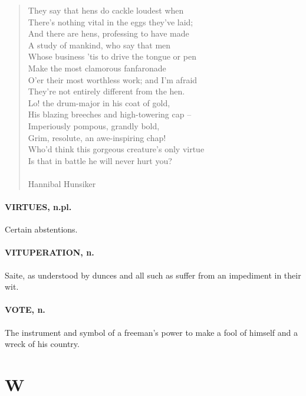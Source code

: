 \documentclass[11pt]{article}
\begin{document}
\begin{quote}   They say that hens do cackle loudest when \\
      There's nothing vital in the eggs they've laid; \\
      And there are hens, professing to have made \\
  A study of mankind, who say that men \\
  Whose business 'tis to drive the tongue or pen \\
      Make the most clamorous fanfaronade \\
      O'er their most worthless work; and I'm afraid \\
  They're not entirely different from the hen. \\
  Lo! the drum-major in his coat of gold, \\
      His blazing breeches and high-towering cap -- \\
  Imperiously pompous, grandly bold, \\
      Grim, resolute, an awe-inspiring chap! \\
  Who'd think this gorgeous creature's only virtue \\
  Is that in battle he will never hurt you? \\
 \\
Hannibal Hunsiker \end{quote}


\paragraph{VIRTUES, n.pl.}  Certain abstentions.

\paragraph{VITUPERATION, n.}  Saite, as understood by dunces and all such as
suffer from an impediment in their wit.

\paragraph{VOTE, n.}  The instrument and symbol of a freeman's power to make a
fool of himself and a wreck of his country.



\section*{W}
\end{document}
